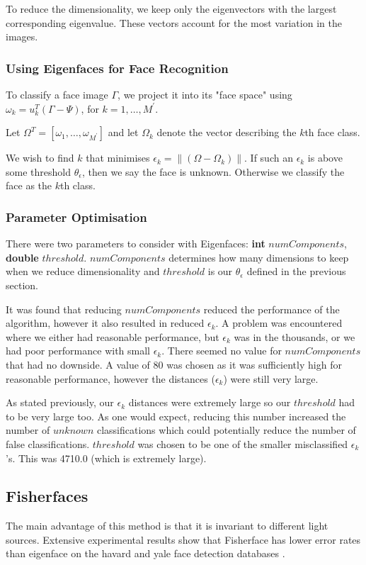 \documentclass{article}
\begin{document}
To reduce the dimensionality, we keep only the eigenvectors with the largest corresponding eigenvalue. These vectors account for the most variation in the images.

\subsubsection{Using Eigenfaces for Face Recognition}
To classify a face image $\Gamma$, we project it into its "face space" using $\omega_k = u^T_k(\Gamma - \Psi)$, for $k = 1, \ldots, M^\prime$.

Let $\Omega^T = [\omega_1, \ldots, \omega_{M^\prime}]$ and let $\Omega_k$ denote the vector describing the $k$th face class.

We wish to find $k$ that minimises $\epsilon_k = \|(\Omega - \Omega_k)\|$. If such an $\epsilon_k$ is above some threshold $\theta_\epsilon$, then we say the face is unknown. Otherwise we classify the face as the $k$th class.

\subsubsection{Parameter Optimisation}
There were two parameters to consider with Eigenfaces: \textbf{int} $numComponents$, \textbf{double} $threshold$. $numComponents$ determines how many dimensions to keep when we reduce dimensionality and $threshold$ is our $\theta_\epsilon$ defined in the previous section.

It was found that reducing $numComponents$ reduced the performance of the algorithm, however it also resulted in reduced $\epsilon_k$. A problem was encountered where we either had reasonable performance, but $\epsilon_k$ was in the thousands, or we had poor performance with small $\epsilon_k$. There seemed no value for $numComponents$ that had no downside. A value of 80 was chosen as it was sufficiently high for reasonable performance, however the distances ($\epsilon_k$) were still very large.

As stated previously, our $\epsilon_k$ distances were extremely large so our $threshold$ had to be very large too. As one would expect, reducing this number increased the number of $unknown$ classifications which could potentially reduce the number of false classifications. $threshold$ was chosen to be one of the smaller misclassified $\epsilon_k$'s. This was 4710.0 (which is extremely large).

\subsection{Fisherfaces}
The main advantage of this method is that it is invariant to different light sources. Extensive experimental results show that Fisherface has lower error rates than eigenface on the havard and yale face detection databases \cite{belhumeur1997eigenfaces}.
\end{document}
